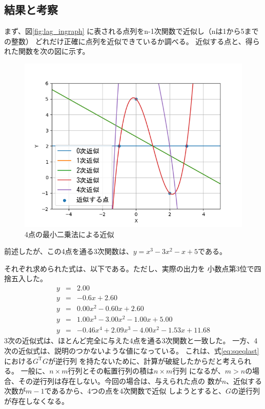 \documentclass{jsarticle}
\begin{document}
\subsection{結果と考察}
まず、図\ref{fig:lag_ingraph} に表される点列をn-1次関数で近似し（nは1から5までの整数）
どれだけ正確に点列を近似できているか調べる。
近似する点と、得られた関数を次の図に示す。
\begin{figure}[htbp]
    \begin{center}
        \includegraphics[width=0.5\hsize]{sq_ex1.png}
        \caption{4点の最小二乗法による近似}\label{fig:sq_ex1}           
    \end{center}
\end{figure}
前述したが、この4点を通る3次関数は、\(y=x^3-3x^2-x+5\)である。

それぞれ求められた式は、以下である。ただし、実際の出力を
小数点第3位で四捨五入した。
\begin{eqnarray*}
    y&=&2.00\\
    y&=&-0.6x+2.60\\
    y&=&0.00x^2-0.60x+2.60\\
    y&=&1.00x^3-3.00x^2-1.00x+5.00\\
    y&=&-0.46x^4+2.09x^3-4.00x^2-1.53x+11.68
\end{eqnarray*}
3次の近似式は、ほとんど完全に与えた4点を通る3次関数と一致した。
一方、4次の近似式は、説明のつかないような値になっている。
これは、式\ref{eq:sqeqlast}における\(G^\mathrm{T}G\)が逆行列
を持たないために、計算が破綻したからだと考えられる。
一般に、\(n\times m\)行列とその転置行列の積は\(n \times m\)行列
になるが、\(m>n\)の場合、その逆行列は存在しない。今回の場合は、与えられた点の
数が\(n\)、近似する次数が\(m-1\)であるから、4つの点を4次関数で近似
しようとすると、\(G\)の逆行列が存在しなくなる。
\end{document}
